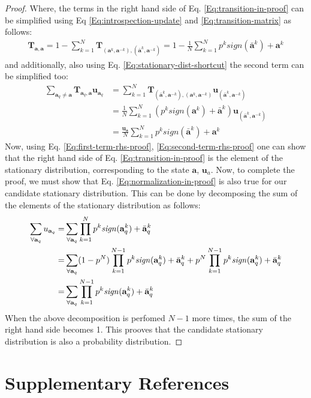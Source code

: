\documentclass[11pt]{article}
\theoremstyle{plainCl1}
\theoremstyle{plainCl2}
\newcommand{\abf}{\mathbf{a}}
\newcommand{\T}{\mathbf{T}}
\newcommand{\ubf}{\mathbf{u}}
\begin{document}
\begin{proof}
Where, the terms in the right hand side of Eq. \ref{Eq:transition-in-proof} can be simplified using Eq \ref{Eq:introspection-update} and \ref{Eq:transition-matrix} as follows:
\begin{eqnarray}
\T_{\abf,\abf} = 1 - \sum_{k=1}^{N} \T_{(\abf^k, \abf^{-k}), (\bar{\abf}^k,\abf^{-k})} = 1 - \frac{1}{N} \sum_{k=1}^{N} p^k \textit{sign}(\bar{\abf}^k) + \abf^k 
\label{Eq:first-term-rhs-proof}
\end{eqnarray} 
and additionally, also using Eq. \ref{Eq:stationary-dist-shortcut} the second term can be simplified too:
\begin{align}
\sum_{\abf_q \neq \abf} \T_{\abf_q, \abf} \ubf_{\abf_q} &= \sum_{k = 1}^N \T_{(\bar{\abf}^k,\abf^{-k}), (\abf^k, \abf^{-k})} \ubf_{(\bar{\abf}^k,\abf^{-k})} \\
&= \frac{1}{N} \sum_{k = 1}^N \left(p^k \textit{sign}(\abf^k) + \bar{\abf}^k \right) \ubf_{(\bar{\abf}^k,\abf^{-k})} \\ 
\label{Eq:second-term-rhs-proof}
&= \frac{\ubf_\abf}{N} \sum_{k=1}^{N} p^k \textit{sign}(\bar{\abf}^k) + \abf^k 
\end{align}
Now, using Eq. \ref{Eq:first-term-rhs-proof}, \ref{Eq:second-term-rhs-proof} one can show that the right hand side of Eq. \ref{Eq:transition-in-proof} is the element of the stationary distribution, corresponding to the state $\abf$, $\ubf_a$.  Now, to complete the proof, we must show that Eq. \ref{Eq:normalization-in-proof} is also true for our candidate stationary distribution. This can be done by decomposing the sum of the elements of the stationary distribution as follows:
\begin{eqnarray}
\sum_{\forall \abf_q} u_{\abf_q} =& \displaystyle \sum_{\forall \abf_q} \prod_{k=1}^N p^k \mathit{sign}(\abf_q^k) + \bar{\abf}_q^k \\
=& \displaystyle \displaystyle \sum_{\forall \abf_q} (1-p^N)  \prod_{k=1}^{N-1} p^k \mathit{sign}(\abf_q^k) + \bar{\abf}_q^k  + p^N  \prod_{k=1}^{N-1} p^k \mathit{sign}(\abf_q^k) + \bar{\abf}_q^k \\ 
=& \displaystyle \sum_{\forall \abf_q} \prod_{k=1}^{N-1} p^k \mathit{sign}(\abf_q^k) + \bar{\abf}_q^k
\end{eqnarray}
When the above decomposition is perfomed $N-1$ more times, the sum of the right hand side becomes 1. This prooves that the candidate stationary distribution is also a probability distribution.
\end{proof}


\section*{Supplementary References}


\end{document}
